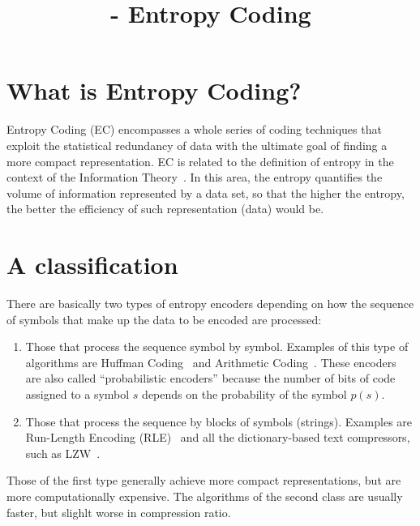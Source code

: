 


\title{\SM{} - Entropy Coding}

\maketitle

\tableofcontents

\section{What is Entropy Coding?}

Entropy Coding (EC) encompasses a whole series of coding techniques
that exploit the statistical redundancy of data with the ultimate goal
of finding a more compact representation. EC is related to the
definition of entropy in the context of the Information
Theory~\cite{vruiz__information_theory}. In this area, the entropy
quantifies the volume of information represented by a data set, so
that the higher the entropy, the better the efficiency of such
representation (data) would be.

\section{A classification}

There are basically two types of entropy encoders depending on how the
sequence of symbols that make up the data to be encoded are processed:

\begin{enumerate}
\item Those that process the sequence symbol by symbol. Examples of
  this type of algorithms are Huffman
  Coding~\cite{vruiz__huffman_coding} and Arithmetic
  Coding~\cite{vruiz__arithmetic_coding}. These encoders are also
  called ``probabilistic encoders'' because the number of bits of code
  assigned to a symbol $s$ depends on the probability of the symbol
  $p(s)$.
\item Those that process the sequence by blocks of symbols
  (strings). Examples are Run-Length Encoding (RLE)~\cite{vruiz__rle}
  and all the dictionary-based text compressors, such as
  LZW~\cite{vruiz__LZW}.
\end{enumerate}
  
Those of the first type generally achieve more compact
representations, but are more computationally expensive. The
algorithms of the second class are usually faster, but slighlt worse
in compression ratio.


